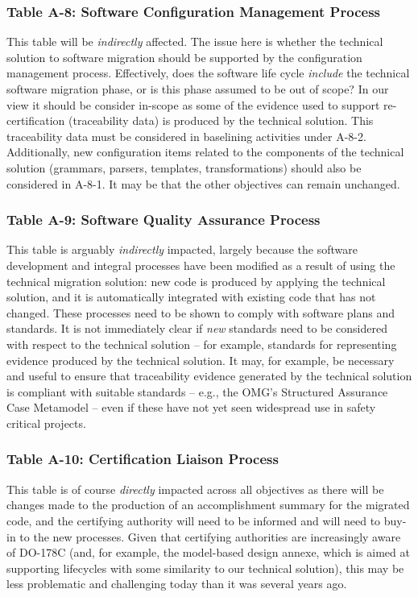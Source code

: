 \documentclass{llncs}
\begin{document}
\subsubsection{Table A-8: Software Configuration Management Process}
This table will be \textit{indirectly} affected. The issue here is whether the technical solution to software migration should be supported by the configuration management process. Effectively, does the software life cycle \textit{include} the technical software migration phase, or is this phase assumed to be out of scope? In our view it should be consider in-scope as some of the evidence used to support re-certification (traceability data) is produced by the technical solution. This traceability data must be considered in baselining activities under A-8-2. Additionally, new configuration items related to the components of the technical solution (grammars, parsers, templates, transformations) should also be considered in A-8-1. It may be that the other objectives can remain unchanged.

\subsubsection{Table A-9: Software Quality Assurance Process}
This table is arguably \textit{indirectly} impacted, largely because the software development and integral processes have been modified as a result of using the technical migration solution: new code is produced by applying the technical solution, and it is automatically integrated with existing code that has not changed. These processes need to be shown to comply with software plans and standards. It is not immediately clear if \textit{new} standards need to be considered with respect to the technical solution -- for example, standards for representing evidence produced by the technical solution. It may, for example, be necessary and useful to ensure that traceability evidence generated by the technical solution is compliant with suitable standards -- e.g., the OMG's Structured Assurance Case Metamodel -- even if these have not yet seen widespread use in safety critical projects.

\subsubsection{Table A-10: Certification Liaison Process}
This table is of course \textit{directly} impacted across all objectives as there will be changes made to the production of an accomplishment summary for the migrated code, and the certifying authority will need to be informed and will need to buy-in to the new processes. Given that certifying authorities are increasingly aware of DO-178C (and, for example, the model-based design annexe, which is aimed at supporting lifecycles with some similarity to our technical solution), this may be less problematic and challenging today than it was several years ago.
\end{document}
